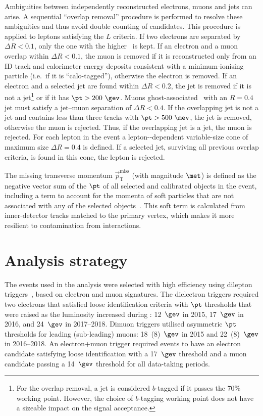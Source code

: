\documentclass[cernpreprint, atlasdraft=false, texlive=2023, UKenglish, texmf, orcidlogo]{atlasdoc}
\begin{document}
Ambiguities between independently reconstructed electrons, muons and jets can arise. A sequential \enquote{overlap removal} procedure is performed to resolve these ambiguities and thus avoid double counting of candidates.
This procedure is applied to leptons satisfying the $L$ criteria.
If two electrons are separated by $\Delta R<0.1$, only the one with the higher \pt\ is kept. If an electron and a muon overlap within $\Delta R<0.1$, the muon is removed if it is reconstructed only from an ID track and calorimeter energy deposits consistent with a minimum-ionising particle (i.e.\ if it is \enquote{calo-tagged}), otherwise the electron is removed. If an electron and a selected jet are found within $\Delta R < 0.2$, the jet is removed if it is not a \bmedium jet\footnote{For the overlap removal, a jet is considered $b$-tagged if it passes the 70\% working point. However, the choice of $b$-tagging working point does not have a sizeable impact on the signal acceptance.} or if it has $\pt > 200~\gev$. Muons ghost-associated~\cite{Cacciari:2008gn} with an $R=0.4$ jet must satisfy a jet--muon separation of $\Delta R < 0.4$.
If the overlapping jet is not a \bmedium jet and contains less than three tracks with $\pt > 500~\mev$, the jet is removed, otherwise the muon is rejected. Thus, if the overlapping jet is a \bmedium jet, the muon is rejected. For each lepton in the event a lepton-\pt-dependent variable-size cone of maximum size $\Delta R=0.4$ is defined. If a selected jet, surviving all previous overlap criteria, is found in this cone, the lepton is rejected.
 
The missing transverse momentum $\vec{p}_{\mathrm{T}}^{\mathrm{miss}}$ (with magnitude $\met$) is defined as the negative vector sum of the $\pt$ of all selected and calibrated objects in the event, including a term to account for the momenta of soft particles that are not associated with any of the selected objects~\cite{PERF-2016-07}.
This soft term is calculated from inner-detector tracks matched to the primary vertex, which makes it more resilient to contamination from \pileup interactions.
 


 
\section{Analysis strategy}
\label{sec:events}

The events used in the analysis were selected with high efficiency using dilepton triggers~\cite{TRIG-2018-01,TRIG-2018-05}, based on electron and muon signatures.
The dielectron triggers required two electrons that satisfied loose identification criteria with $\pt$ thresholds that were raised as the luminosity increased during \RunTwo:
12~$\gev$ in 2015, 17~$\gev$ in 2016, and 24~$\gev$ in 2017--2018.
Dimuon triggers utilised asymmetric $\pt$ thresholds for leading (sub-leading) muons: 18~(8)~$\gev$ in 2015 and  22~(8)~$\gev$ in 2016--2018.
An electron+muon trigger required events to have an electron candidate satisfying loose identification with a 17~$\gev$ threshold and a muon candidate passing a 14~$\gev$ threshold for all data-taking periods.
 
\end{document}
